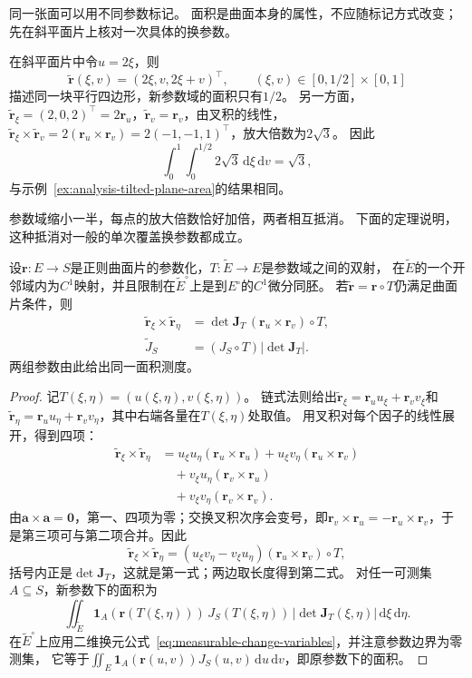 同一张面可以用不同参数标记。
面积是曲面本身的属性，不应随标记方式改变；先在斜平面片上核对一次具体的换参数。

\begin{example}[拉伸一个参数不改变面积]
\label{ex:analysis-stretched-parameter-area}
在斜平面片中令$u=2\xi$，则
\[
 \widetilde{\bm r}(\xi,v)=(2\xi,v,2\xi+v)^\top,\qquad (\xi,v)\in[0,1/2]\times[0,1]
\]
描述同一块平行四边形，新参数域的面积只有$1/2$。
另一方面，$\widetilde{\bm r}_\xi=(2,0,2)^\top=2\bm r_u$，$\widetilde{\bm r}_v=\bm r_v$，由叉积的线性，
$\widetilde{\bm r}_\xi\times\widetilde{\bm r}_v=2(\bm r_u\times\bm r_v)=2(-1,-1,1)^\top$，放大倍数为$2\sqrt3$。
因此
\[
 \int_0^1\int_0^{1/2}2\sqrt3\,\mathrm d\xi\,\mathrm dv=\sqrt3,
\]
与示例~\ref{ex:analysis-tilted-plane-area}的结果相同。
\end{example}

参数域缩小一半，每点的放大倍数恰好加倍，两者相互抵消。
下面的定理说明，这种抵消对一般的单次覆盖换参数都成立。

\begin{theorem}[重参数化下的面积元]
\label{thm:analysis-surface-reparameterization}
设$\bm r:E\to S$是正则曲面片的参数化，$T:\widetilde E\to E$是参数域之间的双射，
在$\widetilde E$的一个开邻域内为$C^1$映射，并且限制在$\widetilde E^\circ$上是到$E^\circ$的$C^1$微分同胚。
若$\widetilde{\bm r}=\bm r\circ T$仍满足曲面片条件，则
\[
 \begin{aligned}
 \widetilde{\bm r}_\xi\times\widetilde{\bm r}_\eta
 &=\det\bm J_T\,(\bm r_u\times\bm r_v)\circ T,\\
 \widetilde J_S&=(J_S\circ T)|\det\bm J_T|.
 \end{aligned}
\]
两组参数由此给出同一面积测度。
\end{theorem}

\begin{proof}
记$T(\xi,\eta)=(u(\xi,\eta),v(\xi,\eta))$。
链式法则给出$\widetilde{\bm r}_\xi=\bm r_u u_\xi+\bm r_v v_\xi$和
$\widetilde{\bm r}_\eta=\bm r_u u_\eta+\bm r_v v_\eta$，其中右端各量在$T(\xi,\eta)$处取值。
用叉积对每个因子的线性展开，得到四项：
\[
 \begin{aligned}
 \widetilde{\bm r}_\xi\times\widetilde{\bm r}_\eta
 &=u_\xi u_\eta(\bm r_u\times\bm r_u)+u_\xi v_\eta(\bm r_u\times\bm r_v)\\
 &\quad{}+v_\xi u_\eta(\bm r_v\times\bm r_u)\\
 &\quad{}+v_\xi v_\eta(\bm r_v\times\bm r_v).
 \end{aligned}
\]
由$\bm a\times\bm a=\bm0$，第一、四项为零；交换叉积次序会变号，即$\bm r_v\times\bm r_u=-\bm r_u\times\bm r_v$，于是第三项可与第二项合并。因此
\[
 \widetilde{\bm r}_\xi\times\widetilde{\bm r}_\eta
 =(u_\xi v_\eta-v_\xi u_\eta)(\bm r_u\times\bm r_v)\circ T,
\]
括号内正是$\det\bm J_T$，这就是第一式；两边取长度得到第二式。
对任一可测集$A\subseteq S$，新参数下的面积为
\[
 \iint_{\widetilde E}\bm1_A(\bm r(T(\xi,\eta)))\,J_S(T(\xi,\eta))\,|\det\bm J_T(\xi,\eta)|\,\mathrm d\xi\,\mathrm d\eta.
\]
在$\widetilde E^\circ$上应用二维换元公式~\eqref{eq:measurable-change-variables}，并注意参数边界为零测集，
它等于$\iint_E\bm1_A(\bm r(u,v))J_S(u,v)\,\mathrm du\,\mathrm dv$，即原参数下的面积。
\end{proof}

